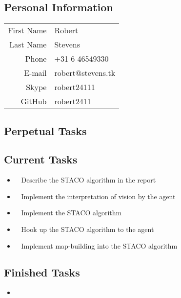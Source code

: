 \subsection{Personal Information}
\begin{table}[h!]
	\begin{tabular}{rl}
	First Name 	& Robert\\
	Last Name	& Stevens\\
	Phone		& +31 6 46549330\\
	E-mail		& robert@stevens.tk\\
	Skype		& robert24111\\
	GitHub		& robert2411
\end{tabular}
\end{table}

\subsection{Perpetual Tasks}

\subsection{Current Tasks}
\begin{itemize}
	\item~
	Describe the STACO algorithm in the report
	\item~
	Implement the interpretation of vision by the agent
	\item~
	Implement the STACO algorithm
	\item~
	Hook up the STACO algorithm to the agent
	\item~
	Implement map-building into the STACO algorithm
\end{itemize}

\subsection{Finished Tasks}
\begin{itemize}
	\item
\end{itemize}
